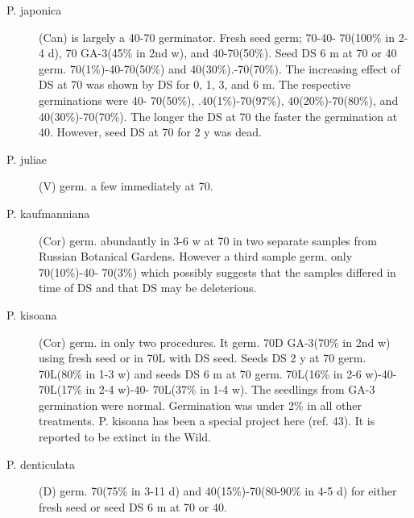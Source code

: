 \begin{description}
\item[P. japonica] (Can) is largely a 40-70 germinator. Fresh seed germ; 70-40-
70(100\% in 2-4 d), 70 GA-3(45\% in 2nd w), and 40-70(50\%). Seed DS 6 m at 70 or
40 germ. 70(1\%)-40-70(50\%) and 40(30\%).-70(70\%). The increasing effect of DS at
70 was shown by DS for 0, 1, 3, and 6 m. The respective germinations were 40-
70(50\%), .40(1\%)-70(97\%), 40(20\%)-70(80\%), and 40(30\%)-70(70\%). The longer the
DS at 70 the faster the germination at 40. However, seed DS at 70 for 2 y was dead.
\item[P. juliae] (V) germ. a few immediately at 70.
\item[P. kaufmanniana] (Cor) germ. abundantly in 3-6 w at 70 in two separate samples
from Russian Botanical Gardens. However a third sample germ. only 70(10\%)-40-
70(3\%) which possibly suggests that the samples differed in time of DS and that DS
may be deleterious.
\item[P. kisoana] (Cor) germ. in only two procedures. It germ. 70D GA-3(70\% in 2nd
w) using fresh seed or in 70L with DS seed. Seeds DS 2 y at 70 germ. 70L(80\% in 1-3
w) and seeds DS 6 m at 70 germ. 70L(16\% in 2-6 w)-40-70L(17\% in 2-4 w)-40-
70L(37\% in 1-4 w). The seedlings from GA-3 germination were normal. Germination
was under 2\% in all other treatments. P. kisoana has been a special project here (ref.
43). It is reported to be extinct in the Wild.
\item[P. denticulata] (D) germ. 70(75\% in 3-11 d) and 40(15\%)-70(80-90\% in 4-5 d)
for either fresh seed or seed DS 6 m at 70 or 40.


\end{description}
